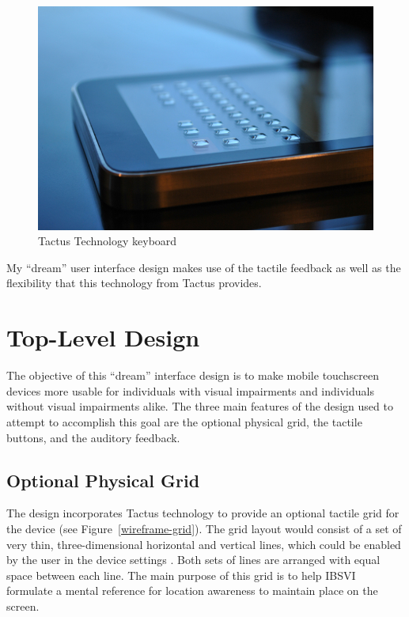 \documentclass[11pt]{article}
\begin{document}
\begin{figure}[ht]
\centering
\includegraphics[width=4.5in]{tactus2.jpg} 
\caption{Tactus Technology keyboard}
\label{tactus1}
\end{figure}

My ``dream'' user interface design makes use of the tactile feedback as well as the flexibility that this technology from Tactus provides.


\section{Top-Level Design}
The objective of this ``dream'' interface design is to make mobile touchscreen devices more usable for individuals with visual impairments and individuals without visual impairments alike. The three main features of the design used to attempt to accomplish this goal are the optional physical grid, the tactile buttons, and the auditory feedback. 


\subsection{Optional Physical Grid}
The design incorporates Tactus technology to provide an optional tactile grid for the device (see Figure~\ref{wireframe-grid}). The grid layout would consist of a set of very thin, three-dimensional horizontal and vertical lines, which could be enabled by the user in the device settings . Both sets of lines are arranged with equal space between each line. The main purpose of this grid is to help IBSVI formulate a mental reference for location awareness to maintain place on the screen.
\end{document}
